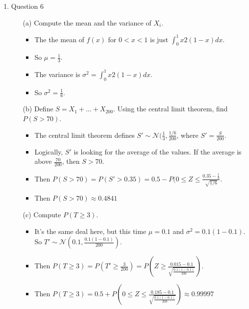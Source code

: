 \documentclass{article}
\begin{document}
\begin{enumerate}
\item Question 6
    \begin{itemize}
    \item [(a)] Compute the mean and the variance of $X_i$.
        \begin{itemize}
        \item The the mean of $f(x)$ for $0 < x < 1$ is just $\int_0^1 x2(1 - x)dx$.
        \item So $\mu = \frac{1}{3}$.
        \item The variance is $\sigma^2 = \int_0^1 x2(1 - x)dx$.
        \item So $\sigma^2 = \frac{1}{6}$.
        \end{itemize}
    \item [(b)] Define $S=X_1+\ldots+X_{200}$. Using the central limit theorem, find $P(S>70)$.
        \begin{itemize}
        \item The central limit theorem defines $S' \sim \mathcal{N}(\frac{1}{3}, \frac{1/6}{200}$, where $S' = \frac{S}{200}$.
        \item Logically, $S'$ is looking for the average of the values. If the average is above $\frac{70}{200}$, then $S > 70$.
        \item Then $P(S > 70) = P(S' > 0.35) = 0.5 - P(0 \leq Z \leq \frac{0.35 - \frac{1}{3}}{\sqrt{1/6}}$.
        \item Then $P(S > 70) \approx 0.4841$
        \end{itemize}
    \item [(c)] Compute $P(T\ge3)$.
        \begin{itemize}
        \item It's the same deal here, but this time $\mu = 0.1$ and $\sigma^2 = 0.1(1 - 0.1)$. So $T' \sim \mathcal{N}(0.1, \frac{0.1(1 - 0.1)}{200})$.
        \item Then $P(T \geq 3) = P(T' \geq \frac{3}{200}) = P(Z \geq \frac{0.015 - 0.1}{\sqrt{\frac{0.1(1 - 0.1)}{200}}})$.
        \item Then $P(T \geq 3) = 0.5 + P(0 \leq Z \leq \frac{0.185 - 0.1}{\sqrt{\frac{0.1(1 - 0.1)}{200}}}) \approx 0.99997$
        \end{itemize}
    \end{itemize}


\end{enumerate}
\end{document}

